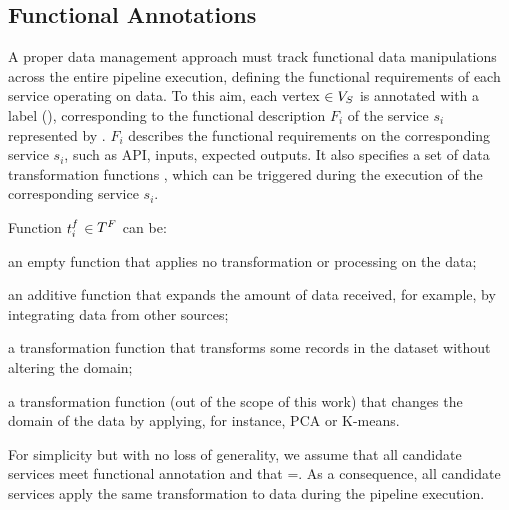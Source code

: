     \subsection{Functional Annotations}\label{sec:funcannotation}
    A proper data management approach must track functional data manipulations across the entire pipeline execution, defining the functional requirements of each service operating on data.
    To this aim, each vertex $\in V_S$ is annotated with a label \myGamma(), corresponding to the functional description $F_i$ of the service $s_i$ represented by .
    $F_i$ describes the functional requirements on the corresponding service $s_i$, such as API, inputs, expected outputs.
    It also specifies a set \TF{} of data transformation functions , which can be triggered during the execution of the corresponding service $s_i$.

    Function $t^f_{i}$$\in$$T^F_{}$ can be:
    \begin{enumerate*}[label=\textit{\roman*})]
      \item an empty function \tf{\epsilon} that applies no transformation or processing on the data;
      \item an additive function  that expands the amount of data received, for example, by integrating data from other sources;
      \item a transformation function  that transforms some records in the dataset without altering the domain;
      \item a transformation function  (out of the scope of this work) that changes the domain of the data by applying, for instance, PCA or K-means.
    \end{enumerate*}

For simplicity but with no loss of generality, we assume that all candidate services meet functional annotation \F{} and that \TF{}=\tf{}. As a consequence, all candidate services apply the same transformation to data during the pipeline execution.

